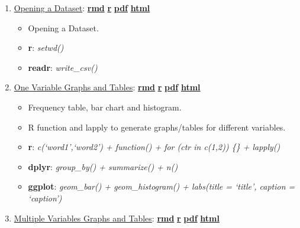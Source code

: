 \documentclass[
]{book}
\providecommand{\tightlist}{%
  \setlength{\itemsep}{0pt}\setlength{\parskip}{0pt}}
\begin{document}
\begin{enumerate}
\def\labelenumi{\arabic{enumi}.}
\tightlist
\item
  \href{https://fanwangecon.github.io/Stat4Econ/descriptive/htmlpdfr/DataBasketball.html}{Opening a Dataset}: \href{https://github.com/FanWangEcon/Stat4Econ/blob/master/descriptive//DataBasketball.Rmd}{\textbf{rmd}} \textbar{} \href{https://github.com/FanWangEcon/Stat4Econ/blob/master/descriptive/htmlpdfr/DataBasketball.R}{\textbf{r}} \textbar{} \href{https://github.com/FanWangEcon/Stat4Econ/blob/master/descriptive/htmlpdfr/DataBasketball.pdf}{\textbf{pdf}} \textbar{} \href{https://fanwangecon.github.io/Stat4Econ/descriptive/htmlpdfr/DataBasketball.html}{\textbf{html}}

  \begin{itemize}
  \tightlist
  \item
    Opening a Dataset.
  \item
    \textbf{r}: \emph{setwd()}
  \item
    \textbf{readr}: \emph{write\_csv()}
  \end{itemize}
\item
  \href{https://fanwangecon.github.io/Stat4Econ/descriptive/htmlpdfr/OneVariable.html}{One Variable Graphs and Tables}: \href{https://github.com/FanWangEcon/Stat4Econ/blob/master/descriptive//OneVariable.Rmd}{\textbf{rmd}} \textbar{} \href{https://github.com/FanWangEcon/Stat4Econ/blob/master/descriptive/htmlpdfr/OneVariable.R}{\textbf{r}} \textbar{} \href{https://github.com/FanWangEcon/Stat4Econ/blob/master/descriptive/htmlpdfr/OneVariable.pdf}{\textbf{pdf}} \textbar{} \href{https://fanwangecon.github.io/Stat4Econ/descriptive/htmlpdfr/OneVariable.html}{\textbf{html}}

  \begin{itemize}
  \tightlist
  \item
    Frequency table, bar chart and histogram.
  \item
    R function and lapply to generate graphs/tables for different variables.
  \item
    \textbf{r}: \emph{c(`word1',`word2') + function() + for (ctr in c(1,2)) \{\} + lapply()}
  \item
    \textbf{dplyr}: \emph{group\_by() + summarize() + n()}
  \item
    \textbf{ggplot}: \emph{geom\_bar() + geom\_histogram() + labs(title = `title', caption = `caption')}
  \end{itemize}
\item
  \href{https://fanwangecon.github.io/Stat4Econ/descriptive/htmlpdfr/MultipleVariables.html}{Multiple Variables Graphs and Tables}: \href{https://github.com/FanWangEcon/Stat4Econ/blob/master/descriptive//MultipleVariables.Rmd}{\textbf{rmd}} \textbar{} \href{https://github.com/FanWangEcon/Stat4Econ/blob/master/descriptive/htmlpdfr/MultipleVariables.R}{\textbf{r}} \textbar{} \href{https://github.com/FanWangEcon/Stat4Econ/blob/master/descriptive/htmlpdfr/MultipleVariables.pdf}{\textbf{pdf}} \textbar{} \href{https://fanwangecon.github.io/Stat4Econ/descriptive/htmlpdfr/MultipleVariables.html}{\textbf{html}}


\end{enumerate}
\end{document}
